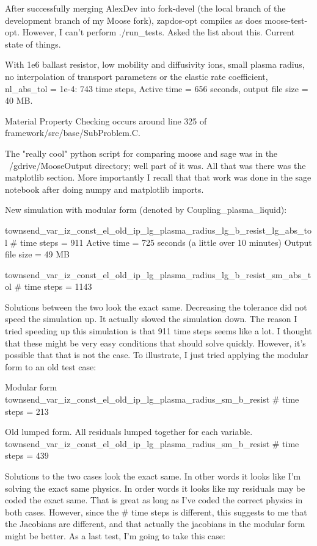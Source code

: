 {After successfully merging AlexDev into fork-devel (the local branch of the development branch of my Moose fork), zapdos-opt compiles as does moose-test-opt. However, I can't perform ./run_tests. Asked the list about this. Current state of things.

With 1e6 ballast resistor, low mobility and diffusivity ions, small plasma radius, no interpolation of transport parameters or the elastic rate coefficient, nl_abs_tol = 1e-4: 743 time steps, Active time = 656 seconds, output file size = 40 MB.

Material Property Checking occurs around line 325 of framework/src/base/SubProblem.C.

The "really cool" python script for comparing moose and sage was in the ~/gdrive/MooseOutput directory; well part of it was. All that was there was the matplotlib section. More importantly I recall that that work was done in the sage notebook after doing numpy and matplotlib imports.

New simulation with modular form (denoted by Coupling_plasma_liquid):

townsend_var_iz_const_el_old_ip_lg_plasma_radius_lg_b_resist_lg_abs_tol
# time steps = 911
Active time = 725 seconds (a little over 10 minutes)
Output file size = 49 MB

townsend_var_iz_const_el_old_ip_lg_plasma_radius_lg_b_resist_sm_abs_tol
# time steps = 1143

Solutions between the two look the exact same. Decreasing the tolerance did not speed the simulation up. It actually slowed the simulation down. The reason I tried speeding up this simulation is that 911 time steps seems like a lot. I thought that these might be very easy conditions that should solve quickly. However, it's possible that that is not the case. To illustrate, I just tried applying the modular form to an old test case:

Modular form
townsend_var_iz_const_el_old_ip_lg_plasma_radius_sm_b_resist
# time steps = 213

Old lumped form. All residuals lumped together for each variable.
townsend_var_iz_const_el_old_ip_lg_plasma_radius_sm_b_resist
# time steps = 439

Solutions to the two cases look the exact same. In other words it looks like I'm solving the exact same physics. In order words it looks like my residuals may be coded the exact same. That is great as long as I've coded the correct physics in both cases. However, since the # time steps is different, this suggests to me that the Jacobians are different, and that actually the jacobians in the modular form might be better. As a last test, I'm going to take this case:

}
